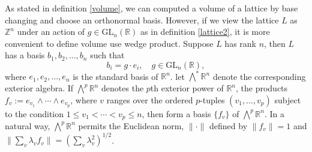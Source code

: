\documentclass[12pt]{article} %
\begin{document}
As stated in definition \ref{volume}, we can computed a volume of a lattice by base changing and
choose an orthonormal basis. However, if we view the lattice $L$ as $\mathbb{Z}^n$ under an action
of $g \in \text{GL}_n(\mathbb{R})$ as in definition \ref{lattice2}, it is more convenient to define volume use wedge  product.
Suppose $L$ has rank $n$, then $L$ has a basis $b_1,b_2,\ldots,b_n$ such that
\[b_i = g \cdot e_i, \quad g \in \text{GL}_n(\mathbb{R}),\]
where $e_1,e_2,\ldots,e_n$ is the standard basis of $\mathbb{R}^n$. let $\bigwedge^* \mathbb{R}^n$ denote the corresponding exterior algebra. If $\bigwedge^p \mathbb{R}^n$ denotes the $p$th exterior power of $\mathbb{R}^n$, the products $f_v := e_{v_1} \wedge \cdots \wedge e_{v_p}$, where $v$ ranges over the ordered $p$-tuples $(v_1, \ldots, v_p)$ subject to the condition $1 \leq v_1 < \cdots < v_p \leq n$, then form a basis $\{f_v\}$ of $\bigwedge^p \mathbb{R}^n$. In a natural way, $\bigwedge^p \mathbb{R}^n$ permits the Euclidean norm, $\lVert \cdot \rVert$ defined by $\lVert f_v \rVert = 1$ and $\lVert \sum_v \lambda_v f_v \rVert = \left( \sum_v \lambda_v^2 \right)^{1/2}$.
\end{document}
